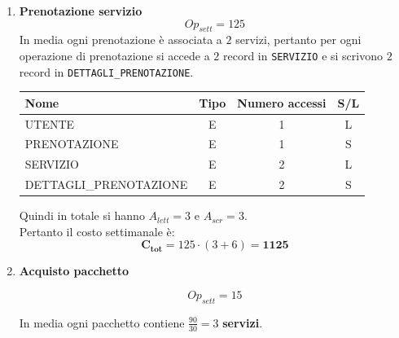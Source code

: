 \documentclass[a4paper,12pt]{report}
\begin{document}
\newpage
\begin{enumerate}
	\item {\large \textbf{Prenotazione servizio}} \label{op1}
	      $$
		      {Op}_{sett}=125
	      $$
	      In media ogni prenotazione è associata a $2$ servizi,
	      pertanto per ogni operazione di prenotazione si accede a $2$ record in \texttt{SERVIZIO}
	      e si scrivono $2$ record in \texttt{DETTAGLI\_PRENOTAZIONE}.

	      \begin{table}[H]
		      \centering
		      \small
		      \renewcommand{\arraystretch}{1.15}
		      \begin{tabularx}{0.8\textwidth}{|X|c|c|c|}
			      \hline
			      \rowcolor{gray!20}
			      \textbf{Nome}          & \textbf{Tipo} & \textbf{Numero accessi} & \textbf{S/L} \\
			      \hline
			      UTENTE                 & E             & 1                       & L            \\
			      PRENOTAZIONE           & E             & 1                       & S            \\
			      SERVIZIO               & E             & 2                       & L            \\
			      DETTAGLI\_PRENOTAZIONE & E             & 2                       & S            \\
			      \hline
		      \end{tabularx}
	      \end{table}

	      Quindi in totale si hanno $A_{lett}=3$ e $A_{scr}=3$. \\
	      Pertanto il costo settimanale è:
	      $$\mathbf{C_{tot}} = 125 \cdot (3+6)=\mathbf{1125}$$

	\item {\large \textbf{Acquisto pacchetto}} \label{op2}

	      $$
		      {Op}_{sett} = 15
	      $$

	      In media ogni pacchetto contiene $\frac{90}{30}=3$ \textbf{servizi}.


\end{enumerate}
\end{document}
